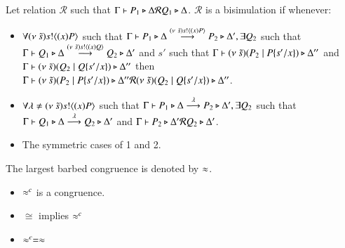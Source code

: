 \begin{definition}[Bisimulation]\rm
	Let relation $\mathcal{R}$ such that $\Gamma \vdash P_1 \triangleright \Delta \mathcal{R} Q_1 \triangleright \Delta$.
	$\mathcal{R}$ is a bisimulation if whenever:
	\begin{itemize}
		\item	$\forall (\nu\ \tilde{s}) s ! \langle (x)P \rangle$ such that $\Gamma \vdash P_1 \triangleright \Delta \stackrel{(\nu\ \tilde{s}) s ! \langle (x)P \rangle}{\longrightarrow} P_2 \triangleright \Delta', \exists
			Q_2$ such that $\Gamma \vdash Q_1 \triangleright \Delta \stackrel{(\nu\ \tilde{s}) s ! \langle (x)Q \rangle}{\longrightarrow} Q_2 \triangleright \Delta'$ and
			$s'$ such that $\Gamma \vdash (\nu\ \tilde{s})(P_2 \;|\; P \{s'/x \}) \triangleright \Delta''$ and
			$\Gamma \vdash (\nu\ \tilde{s})(Q_2 \;|\; Q \{s'/x \}) \triangleright \Delta''$ then
			$\Gamma \vdash (\nu\ \tilde{s})(P_2 \;|\; P \{s'/x \}) \triangleright \Delta'' \mathcal{R} (\nu\ \tilde{s})(Q_2 \;|\; Q \{s'/x \}) \triangleright \Delta''$.

		\item	$\forall \lambda \not= (\nu\ \tilde{s}) s ! \langle (x)P \rangle$ such that $\Gamma \vdash P_1 \triangleright \Delta \stackrel{\lambda}{\longrightarrow} P_2 \triangleright \Delta', \exists
			Q_2$ such that $\Gamma \vdash Q_1 \triangleright \Delta \stackrel{\lambda}{\longrightarrow} Q_2 \triangleright \Delta'$ and
			$\Gamma \vdash P_2 \triangleright \Delta' \mathcal{R} Q_2 \triangleright \Delta'$.

		\item	The symmetric cases of 1 and 2.
	\end{itemize}
	The largest barbed congruence is denoted by $\approx$.
\end{definition}

\begin{theorem}
	\begin{itemize}
		\item	$\approx^c$ is a congruence.
		\item	$\cong$ implies $\approx^c$
		\item	$\approx^c = \approx$
	\end{itemize}
\end{theorem}
